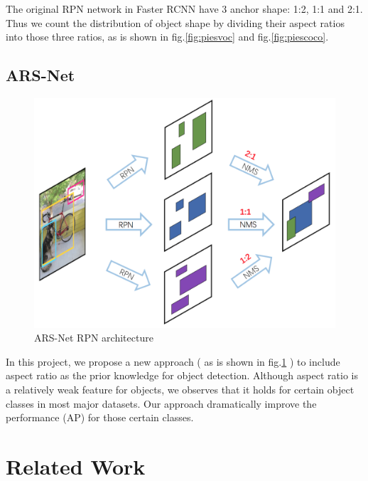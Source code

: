 \documentclass[10pt,twocolumn,letterpaper]{article}
\begin{document}




The original RPN network in Faster RCNN \cite{fasterRCNN} have 3 anchor shape: 1:2, 1:1 and 2:1. Thus we count the distribution of object shape by dividing their aspect ratios into those three ratios, as is shown in fig.\ref{fig:piesvoc} and fig.\ref{fig:piescoco}.

\subsection{ARS-Net}
\begin{figure}[h]
\centering
\includegraphics[width=0.7\linewidth]{pic/ARS-archi-abstract.png}
\caption{ARS-Net RPN architecture}
\label{fig:ARS-archi}
\end{figure}

\par
In this project, we propose a new approach ( as is shown in fig.\ref{fig:ARS-archi} ) to include aspect ratio as the prior knowledge for object detection. Although aspect ratio is a relatively weak feature for objects, we observes that it holds for certain object classes in most major datasets. Our approach dramatically improve the performance (AP) for those certain classes.

\section{Related Work}
	\label{sec:related-work}
\end{document}
